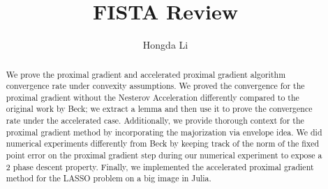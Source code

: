 \documentclass[]{article}
\title{FISTA Review}
\author{Hongda Li}
\theoremstyle{definition}
\begin{document}
\maketitle
\begin{abstract}
    We prove the proximal gradient and accelerated proximal gradient algorithm convergence rate under convexity assumptions. We proved the convergence for the proximal gradient without the Nesterov Acceleration differently compared to the original work by Beck\cite{paper:FISTA}; we extract a lemma and then use it to prove the convergence rate under the accelerated case. Additionally, we provide thorough context for the proximal gradient method by incorporating the majorization via envelope idea. We did numerical experiments differently from Beck by keeping track of the norm of the fixed point error on the proximal gradient step during our numerical experiment to expose a 2 phase descent property. Finally, we implemented the accelerated proximal gradient method for the LASSO problem on a big image in Julia.
\end{abstract}

\end{document}
